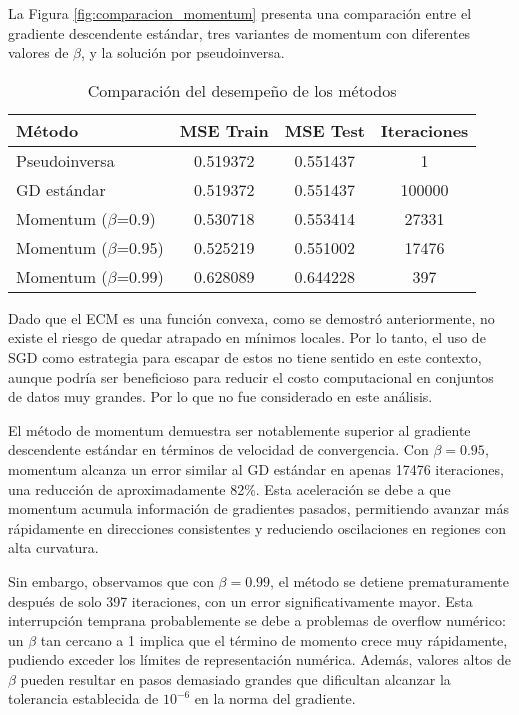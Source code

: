 \documentclass{tp02}
\begin{document}
La Figura \ref{fig:comparacion_momentum} presenta una comparación entre el 
gradiente descendente estándar, tres variantes de momentum con diferentes 
valores de $\beta$, y la solución por pseudoinversa. 

\begin{table}[h]
\centering
\begin{tabular}{|l|c|c|c|}
\hline
Método & MSE Train & MSE Test & Iteraciones \\
\hline
Pseudoinversa & 0.519372 & 0.551437 & 1 \\
GD estándar & 0.519372 & 0.551437 & 100000 \\
Momentum ($\beta$=0.9) & 0.530718 & 0.553414 & 27331 \\
Momentum ($\beta$=0.95) & 0.525219 & 0.551002 & 17476 \\
Momentum ($\beta$=0.99) & 0.628089 & 0.644228 & 397 \\
\hline
\end{tabular}
\caption{Comparación del desempeño de los métodos}
\label{tab:momentum_comparison}
\end{table}

Dado que el ECM es una función convexa, como se demostró anteriormente, 
no existe el riesgo de quedar atrapado en mínimos locales. Por lo tanto, 
el uso de SGD como estrategia para escapar de estos no tiene sentido en 
este contexto, aunque podría ser beneficioso para reducir el costo 
computacional en conjuntos de datos muy grandes. Por lo que no fue
considerado en este análisis.

El método de momentum demuestra ser notablemente superior al gradiente 
descendente estándar en términos de velocidad de convergencia. Con 
$\beta = 0.95$, momentum alcanza un error similar al GD estándar en 
apenas 17476 iteraciones, una reducción de aproximadamente 82\%. Esta 
aceleración se debe a que momentum acumula información de gradientes 
pasados, permitiendo avanzar más rápidamente en direcciones consistentes 
y reduciendo oscilaciones en regiones con alta curvatura.

Sin embargo, observamos que con $\beta = 0.99$, el método se detiene 
prematuramente después de solo 397 iteraciones, con un error 
significativamente mayor. Esta interrupción temprana probablemente se 
debe a problemas de overflow numérico: un $\beta$ tan cercano a 1 implica 
que el término de momento crece muy rápidamente, pudiendo exceder los 
límites de representación numérica. Además, valores altos de $\beta$ 
pueden resultar en pasos demasiado grandes que dificultan alcanzar la 
tolerancia establecida de $10^{-6}$ en la norma del gradiente.
\end{document}
